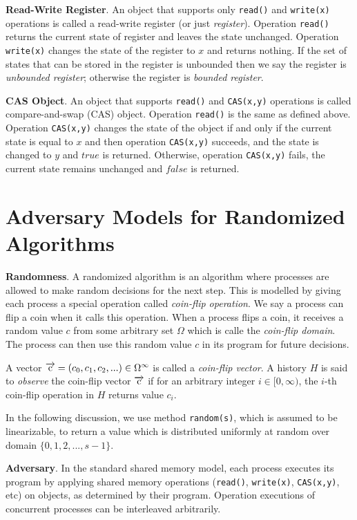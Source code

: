 \textbf{Read-Write Register}. An object that supports only \texttt{read()} and \texttt{write(x)} operations is called
a read-write register (or just \emph{register}). Operation \texttt{read()} returns the current state of register and
leaves the state unchanged. Operation \texttt{write(x)} changes the state of the register to $x$ and returns nothing.
If the set of states that can be stored in the register is unbounded then we say the register is \emph{unbounded register};
otherwise the register is \emph{bounded register}.

\textbf{CAS Object}. An object that supports \texttt{read()} and \texttt{CAS(x,y)} operations is called compare-and-swap (CAS) object.
Operation \texttt{read()} is the same as defined above. Operation \texttt{CAS(x,y)} changes the state of
the object if and only if the current state is equal to $x$ and then operation \texttt{CAS(x,y)} succeeds, and the state is changed
to $y$ and $true$ is returned. Otherwise, operation \texttt{CAS(x,y)} fails, the current state remains unchanged and
$false$ is returned.

\section{Adversary Models for Randomized Algorithms}

\textbf{Randomness}.
A randomized algorithm is an algorithm where processes are allowed to make random decisions for the next step.
This is modelled by giving each process a special operation called \emph{coin-flip operation}. We say a process can flip a coin
when it calls this operation. When a process flips a coin, it receives a random value $c$ from some arbitrary set $\Omega$
which is calle the \emph{coin-flip domain}. The process can then use this random value $c$ in its program for future decisions.

A vector $\overrightarrow{\rm c} = (c_0, c_1, c_2,...) \in \Omega^{\infty}$ is called a \emph{coin-flip vector}.
A history $H$ is said to \emph{observe} the coin-flip vector $\overrightarrow{\rm c}$ if
for an arbitrary integer $i \in [0, \infty)$, the $i$-th coin-flip operation in $H$ returns value $c_i$.

In the following discussion, we use method \texttt{random(s)}, which is assumed
to be linearizable, to return a value which is distributed uniformly at random over domain
$\{0, 1, 2,..., s-1\}$.

\textbf{Adversary}.
In the standard shared memory model, each process executes its program by applying
shared memory operations (\texttt{read()}, \texttt{write(x)}, \texttt{CAS(x,y)}, etc) on objects,
as determined by their program. Operation executions of concurrent processes
can be interleaved arbitrarily.


